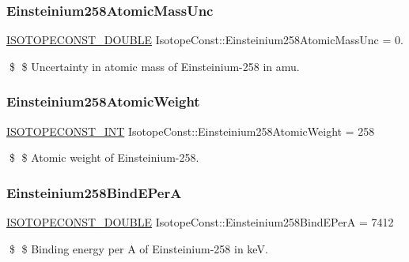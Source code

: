 \subsubsection{\texorpdfstring{Einsteinium258\+Atomic\+Mass\+Unc}{Einsteinium258AtomicMassUnc}}
{\footnotesize\ttfamily \mbox{\hyperlink{group___isotope_const-_macros_ga8f45a7272ce02c0b4c65c44636ed719a}{I\+S\+O\+T\+O\+P\+E\+C\+O\+N\+S\+T\+\_\+\+D\+O\+U\+B\+LE}} Isotope\+Const\+::\+Einsteinium258\+Atomic\+Mass\+Unc = 0.}

\$ \$ Uncertainty in atomic mass of Einsteinium-\/258 in amu. \mbox{\label{group___isotope_const-_einsteinium-_es258_gaf2486c3147ea96a588677e200894a6d6}} 
\subsubsection{\texorpdfstring{Einsteinium258\+Atomic\+Weight}{Einsteinium258AtomicWeight}}
{\footnotesize\ttfamily \mbox{\hyperlink{group___isotope_const-_macros_ga5f18360b3e99483a35c32d789e62621c}{I\+S\+O\+T\+O\+P\+E\+C\+O\+N\+S\+T\+\_\+\+I\+NT}} Isotope\+Const\+::\+Einsteinium258\+Atomic\+Weight = 258}

\$ \$ Atomic weight of Einsteinium-\/258. \mbox{\label{group___isotope_const-_einsteinium-_es258_ga3540b99331d3486c20167bfb98e085ab}} 
\subsubsection{\texorpdfstring{Einsteinium258\+Bind\+E\+PerA}{Einsteinium258BindEPerA}}
{\footnotesize\ttfamily \mbox{\hyperlink{group___isotope_const-_macros_ga8f45a7272ce02c0b4c65c44636ed719a}{I\+S\+O\+T\+O\+P\+E\+C\+O\+N\+S\+T\+\_\+\+D\+O\+U\+B\+LE}} Isotope\+Const\+::\+Einsteinium258\+Bind\+E\+PerA = 7412}

\$ \$ Binding energy per A of Einsteinium-\/258 in keV. \mbox{\label{group___isotope_const-_einsteinium-_es258_gaefa665e63265d367b75748cfb0117cea}} 
